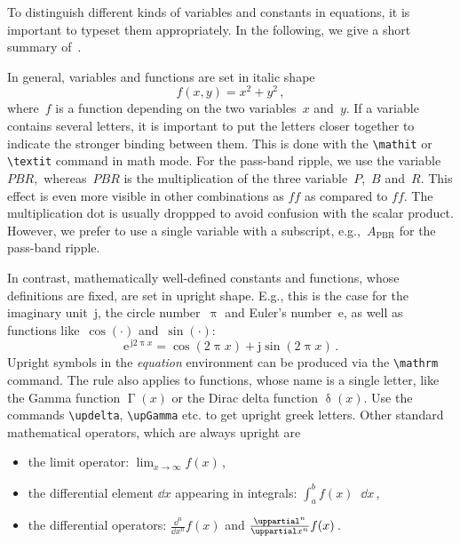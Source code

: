 To distinguish different kinds of variables and constants in equations, it is important to typeset them appropriately. 	
In the following, we give a short summary of~\cite{nadler_isokonform_2018}. 

In general, variables and functions are set in italic shape
\begin{equation}
    f(x,y) = x^2 + y^2 \,,
\end{equation}
where~$f$ is a function depending on the two variables~$x$ and~$y$. 
If a variable contains several letters, it is important to put the letters closer together to indicate the stronger binding between them. 
This is done with the \verb|\mathit| or \verb|\textit| command in math mode. 
For the pass-band ripple, we use the variable~$\textit{PBR}$,~whereas~$PBR$ is the multiplication of the three variable~$P$,~$B$ and~$R$. 
This effect is even more visible in other combinations as $\textit{ff}$ as compared to $ff$. 
The multiplication dot is usually droppped to avoid confusion with the scalar product. 
However, we prefer to use a single variable with a subscript, e.g.,~$A_\mathrm{PBR}$ for the pass-band ripple. 

In contrast, mathematically well-defined constants and functions, whose definitions are fixed, are set in upright shape. 
E.g., this is the case for the imaginary unit~$\mathrm j$, the circle number~$\uppi$ and Euler's number~$ \mathrm e$, as well as functions like~$\cos(\cdot)$ and~$\sin(\cdot)$:
\begin{equation}
    \mathrm {e}^{\,\mathrm{j}2\uppi x} = \cos (2\uppi x) + \mathrm{j}\sin(2\uppi x) \,.
\end{equation}
Upright symbols in the \emph{equation} environment can be produced via the \verb|\mathrm| command.
The rule also applies to functions, whose name is a single letter, like the Gamma function $\upGamma(x)$ or the Dirac delta function $\updelta(x)$. 
Use the commands \verb|\updelta|, \verb|\upGamma| etc. to get upright greek letters.
Other standard mathematical operators, which are always upright are
\begin{itemize}
    \item the limit operator: $\lim \nolimits_{x \rightarrow \infty} f(x)$\,,
    \item the differential element $\dd x$ appearing in integrals: $\int \nolimits_{a}^b f(x) \mathop{}\!\dd x$\,,
    \item the differential operators: $\tfrac{\dd^n}{\dd x^n} f(x)$ and $\tfrac{\uppartial^n}{\uppartial x^n} f(x)$\,.
\end{itemize} 	

